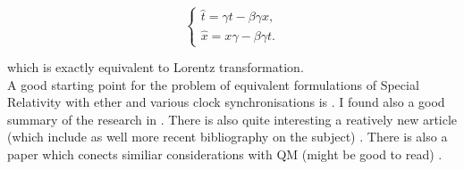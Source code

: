 \documentclass[main.tex]{subfiles}
\begin{document}
\begin{equation}
\begin{cases}
\hat{t} = \gamma t - \beta \gamma x, \\
\hat{x} = x\gamma - \beta \gamma t. 
\end{cases}
\end{equation}

which is exactly equivalent to Lorentz transformation.\\

A good starting point for the problem of equivalent formulations of Special Relativity with ether and various clock synchronisations is \cite{mansouri1977}. I found also a good summary of the research in \cite{vetharaniam1995}. There is also quite interesting a reatively new article (which include as well more recent bibliography on the subject) \cite{spavieri2022}. There is also a paper which conects similiar considerations with QM (might be good to read) \cite{gunn1995}.
\end{document}
